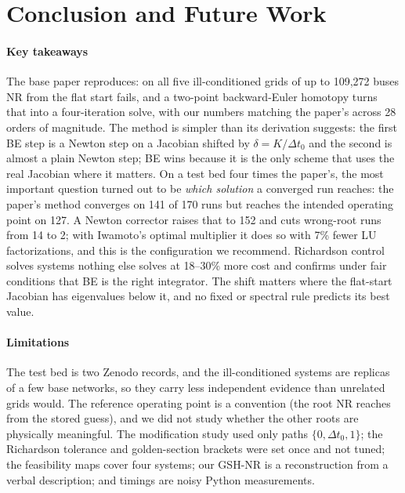 \documentclass[sigconf,nonacm]{acmart}
\begin{document}
\clearpage
\makeatletter\global\@colht\textheight\global\@colroom\textheight\global\vsize\textheight\makeatother
\section{Conclusion and Future Work}\label{sec:conclusion}
\paragraph{Key takeaways} The base paper reproduces: on all five ill-conditioned grids of up to 109{,}272
buses NR from the flat start fails, and a two-point backward-Euler homotopy turns that into a
four-iteration solve, with our numbers matching the paper's across 28 orders of magnitude. The method is
simpler than its derivation suggests: the first BE step is a Newton step on a Jacobian shifted by
$\delta=K/\Delta t_0$ and the second is almost a plain Newton step; BE wins because it is the only scheme
that uses the real Jacobian where it matters. On a test bed four times the paper's, the most important
question turned out to be \emph{which solution} a converged run reaches: the paper's method converges on 141
of 170 runs but reaches the intended operating point on 127. A Newton corrector raises that to 152 and cuts
wrong-root runs from 14 to 2; with Iwamoto's optimal multiplier it does so with 7\% fewer LU factorizations,
and this is the configuration we recommend. Richardson control solves systems nothing else solves at 18--30\%
more cost and confirms under fair conditions that BE is the right integrator. The shift matters where the
flat-start Jacobian has eigenvalues below it, and no fixed or spectral rule predicts its best value.

\paragraph{Limitations} The test bed is two Zenodo records, and the ill-conditioned systems are replicas of a
few base networks, so they carry less independent evidence than unrelated grids would. The reference
operating point is a convention (the root NR reaches from the stored guess), and we did not study whether the
other roots are physically meaningful. The modification study used only paths $\{0,\Delta t_0,1\}$; the
Richardson tolerance and golden-section brackets were set once and not tuned; the feasibility maps cover four
systems; our GSH-NR is a reconstruction from a verbal description; and timings are noisy Python measurements.
\end{document}

